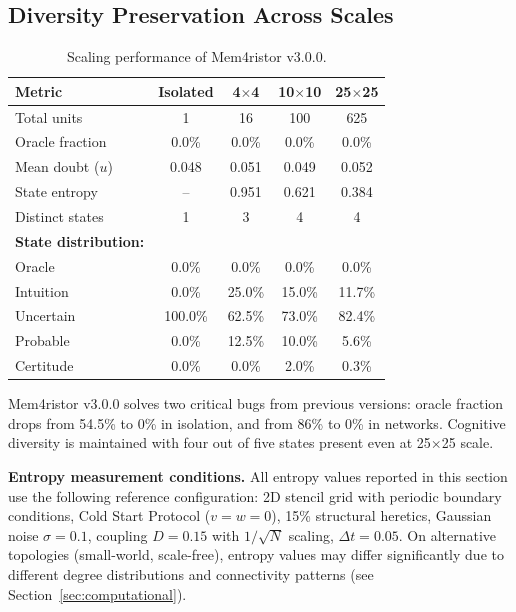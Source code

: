 \documentclass[11pt]{article}
\begin{document}
\subsection{Diversity Preservation Across Scales}

\begin{table}[h]
\centering
\caption{Scaling performance of Mem4ristor v3.0.0.}
\label{tab:scaling}
\begin{tabular}{lcccc}
\toprule
\textbf{Metric} & \textbf{Isolated} & \textbf{4$\times$4} & \textbf{10$\times$10} & \textbf{25$\times$25} \\
\midrule
Total units        & 1   & 16   & 100   & 625   \\
Oracle fraction    & 0.0\% & 0.0\% & 0.0\% & 0.0\% \\
Mean doubt ($u$)   & 0.048 & 0.051 & 0.049 & 0.052 \\
State entropy      & --  & 0.951 & 0.621 & 0.384 \\
Distinct states    & 1   & 3     & 4     & 4     \\
\addlinespace
\textbf{State distribution:} & & & & \\
\quad Oracle     & 0.0\% & 0.0\% & 0.0\% & 0.0\% \\
\quad Intuition  & 0.0\% & 25.0\% & 15.0\% & 11.7\% \\
\quad Uncertain  & 100.0\% & 62.5\% & 73.0\% & 82.4\% \\
\quad Probable   & 0.0\% & 12.5\% & 10.0\% & 5.6\% \\
\quad Certitude  & 0.0\% & 0.0\% & 2.0\% & 0.3\% \\
\bottomrule
\end{tabular}
\end{table}

Mem4ristor v3.0.0 solves two critical bugs from previous versions: oracle fraction drops from 54.5\% to 0\% in isolation, and from 86\% to 0\% in networks. Cognitive diversity is maintained with four out of five states present even at 25$\times$25 scale.

\textbf{Entropy measurement conditions.} All entropy values reported in this section use the following reference configuration: 2D stencil grid with periodic boundary conditions, Cold Start Protocol ($v = w = 0$), 15\% structural heretics, Gaussian noise $\sigma = 0.1$, coupling $D = 0.15$ with $1/\sqrt{N}$ scaling, $\Delta t = 0.05$. On alternative topologies (small-world, scale-free), entropy values may differ significantly due to different degree distributions and connectivity patterns (see Section~\ref{sec:computational}).
\end{document}
